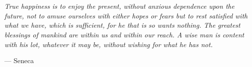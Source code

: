 \documentclass[a4,10pt,twoside,openright,italian,english]{book}%
\author{Ewerton Lopes Silva de Oliveira}
\title{\thesistitle}
\begin{document}

\maketitle

\hypersetup{pageanchor=true}

\cleardoublepage
\newpage

\setcounter{page}{1}
\pagestyle{fancy} %

% 





\chapter*{}
\vspace*{\fill}
\renewcommand{\epigraphsize}{\large}
\setlength{\epigraphwidth}{0.5\textwidth}
\epigraph{\itshape True happiness is to enjoy the present, without anxious dependence upon the future, not to amuse ourselves with either hopes or fears but to rest satisfied with what we have, which is sufficient, for he that is so wants nothing. The greatest blessings of mankind are within us and within our reach. A wise man is content with his lot, whatever it may be, without wishing for what he has not.}{--- Seneca}
\cleardoublepage
\end{document}
